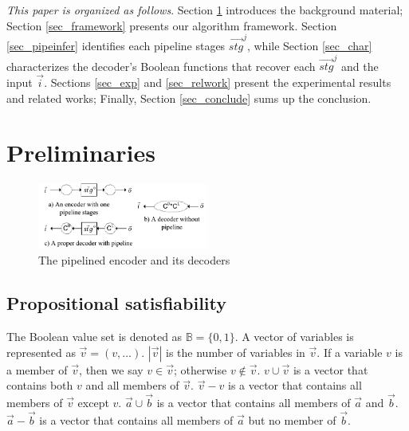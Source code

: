 \documentclass[conference]{IEEEtran}
\begin{document}
\emph{This paper is organized as follows}.
Section \ref{sec_prem} introduces the background material;
Section \ref{sec_framework} presents our algorithm framework.
Section \ref{sec_pipeinfer} identifies each pipeline stages $\vec{stg}^j$,
while Section \ref{sec_char} characterizes the decoder's Boolean functions that recover each $\vec{stg}^j$ and the input $\vec{i}$.
Sections \ref{sec_exp} and \ref{sec_relwork} present the experimental results and related works;
Finally,
Section \ref{sec_conclude} sums up the conclusion.

\section{Preliminaries}\label{sec_prem}


\begin{figure}[t]
\begin{center}
\includegraphics[width=0.5\textwidth]{pipeline}
\end{center}
\caption{The pipelined encoder and its decoders}
\label{fig_pipe}
\end{figure}

\subsection{Propositional satisfiability}\label{subsec_SAT}
The Boolean value set is denoted as $\mathbb{B}=\{0,1\}$.
A vector of variables is represented as $\vec{v}=(v,\dots)$.
$|\vec{v}|$ is the number of variables in $\vec{v}$. 
If a variable $v$ is a member of $\vec{v}$,
then we say $v\in\vec{v}$;
otherwise $v\notin\vec{v}$.
$v\cup\vec{v}$ is a vector that contains both $v$ and all members of $\vec{v}$.
$\vec{v}-v$ is a vector that contains all members of $\vec{v}$ except $v$.
$\vec{a}\cup\vec{b}$ is a vector that contains  all members of $\vec{a}$ and $\vec{b}$.
$\vec{a}-\vec{b}$ is a vector that contains  all members of $\vec{a}$ but no member of $\vec{b}$.
\end{document}
